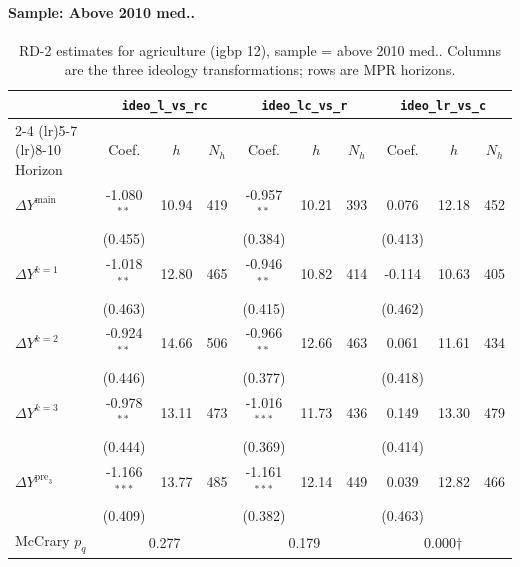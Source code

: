 \documentclass[11pt]{article}
\begin{document}
\paragraph{Sample: Above 2010 med..}
\begin{table}[H]
\centering
\scriptsize
\caption{RD-2 estimates for agriculture (igbp 12), sample = above 2010 med..
Columns are the three ideology transformations; rows are MPR horizons.}
\label{tab:rd2_agriculture_above}
\begin{tabular}{l ccc ccc ccc}
\toprule
 & \multicolumn{3}{c}{\texttt{ideo\_l\_vs\_rc}}
 & \multicolumn{3}{c}{\texttt{ideo\_lc\_vs\_r}}
 & \multicolumn{3}{c}{\texttt{ideo\_lr\_vs\_c}} \\
\cmidrule(lr){2-4} \cmidrule(lr){5-7} \cmidrule(lr){8-10}
Horizon & Coef. & $h$ & $N_h$ & Coef. & $h$ & $N_h$ & Coef. & $h$ & $N_h$ \\
\midrule
$\Delta Y^{\text{main}}$ & -1.080$^{**}$ & 10.94 & 419 & -0.957$^{**}$ & 10.21 & 393 & 0.076 & 12.18 & 452 \\
 & (0.455) &  &  & (0.384) &  &  & (0.413) &  &  \\
\addlinespace[1pt]
$\Delta Y^{k=1}$ & -1.018$^{**}$ & 12.80 & 465 & -0.946$^{**}$ & 10.82 & 414 & -0.114 & 10.63 & 405 \\
 & (0.463) &  &  & (0.415) &  &  & (0.462) &  &  \\
\addlinespace[1pt]
$\Delta Y^{k=2}$ & -0.924$^{**}$ & 14.66 & 506 & -0.966$^{**}$ & 12.66 & 463 & 0.061 & 11.61 & 434 \\
 & (0.446) &  &  & (0.377) &  &  & (0.418) &  &  \\
\addlinespace[1pt]
$\Delta Y^{k=3}$ & -0.978$^{**}$ & 13.11 & 473 & -1.016$^{***}$ & 11.73 & 436 & 0.149 & 13.30 & 479 \\
 & (0.444) &  &  & (0.369) &  &  & (0.414) &  &  \\
\addlinespace[1pt]
$\Delta Y^{\text{pre}_3}$ & -1.166$^{***}$ & 13.77 & 485 & -1.161$^{***}$ & 12.14 & 449 & 0.039 & 12.82 & 466 \\
 & (0.409) &  &  & (0.382) &  &  & (0.463) &  &  \\
\addlinespace[1pt]
\midrule
McCrary $p_q$ & \multicolumn{3}{c}{0.277} & \multicolumn{3}{c}{0.179} & \multicolumn{3}{c}{0.000$\dagger$} \\
\bottomrule
\end{tabular}
\end{table}
\end{document}
